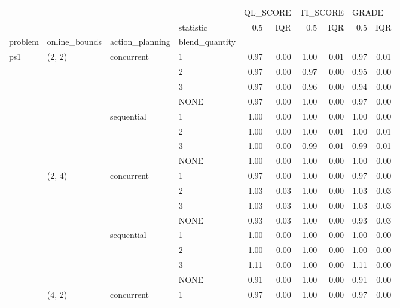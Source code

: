\begin{tabular}{llllrrrrrr}
\toprule
    &        &            & {} & \multicolumn{2}{l}{QL\_SCORE} & \multicolumn{2}{l}{TI\_SCORE} & \multicolumn{2}{l}{GRADE} \\
    &        &            & statistic &      0.5 &  IQR &      0.5 &  IQR &   0.5 &  IQR \\
problem & online\_bounds & action\_planning & blend\_quantity &          &      &          &      &       &      \\
\midrule
ps1 & (2, 2) & concurrent & 1 &     0.97 & 0.00 &     1.00 & 0.01 &  0.97 & 0.01 \\
    &        &            & 2 &     0.97 & 0.00 &     0.97 & 0.00 &  0.95 & 0.00 \\
    &        &            & 3 &     0.97 & 0.00 &     0.96 & 0.00 &  0.94 & 0.00 \\
    &        &            & NONE &     0.97 & 0.00 &     1.00 & 0.00 &  0.97 & 0.00 \\
    &        & sequential & 1 &     1.00 & 0.00 &     1.00 & 0.00 &  1.00 & 0.00 \\
    &        &            & 2 &     1.00 & 0.00 &     1.00 & 0.01 &  1.00 & 0.01 \\
    &        &            & 3 &     1.00 & 0.00 &     0.99 & 0.01 &  0.99 & 0.01 \\
    &        &            & NONE &     1.00 & 0.00 &     1.00 & 0.00 &  1.00 & 0.00 \\
    & (2, 4) & concurrent & 1 &     0.97 & 0.00 &     1.00 & 0.00 &  0.97 & 0.00 \\
    &        &            & 2 &     1.03 & 0.03 &     1.00 & 0.00 &  1.03 & 0.03 \\
    &        &            & 3 &     1.03 & 0.03 &     1.00 & 0.00 &  1.03 & 0.03 \\
    &        &            & NONE &     0.93 & 0.03 &     1.00 & 0.00 &  0.93 & 0.03 \\
    &        & sequential & 1 &     1.00 & 0.00 &     1.00 & 0.00 &  1.00 & 0.00 \\
    &        &            & 2 &     1.00 & 0.00 &     1.00 & 0.00 &  1.00 & 0.00 \\
    &        &            & 3 &     1.11 & 0.00 &     1.00 & 0.00 &  1.11 & 0.00 \\
    &        &            & NONE &     0.91 & 0.00 &     1.00 & 0.00 &  0.91 & 0.00 \\
    & (4, 2) & concurrent & 1 &     0.97 & 0.00 &     1.00 & 0.00 &  0.97 & 0.00 \\

\end{tabular}
